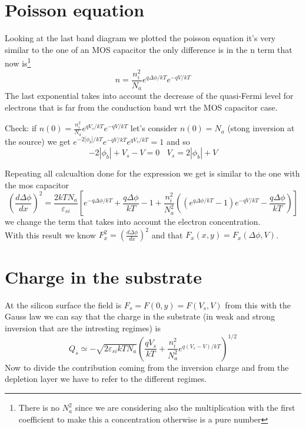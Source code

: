 \section{Poisson equation}
Looking at the last band diagram we plotted the poisson equation it's very similar to the one of an MOS capacitor the only difference is in the n term that now is\footnote{There is no $N_a^2$ since we are considering also the multiplication with the first coefficient to make this a concentration otherwise is a pure number} 
\begin{equation}
n=\frac{n_i^2}{N_a}e^{q\Delta \phi /kT}e^{-qV/kT}
\end{equation}
The last exponential takes into account the decrease of the quasi-Fermi level for electrons that is far from the conduction band wrt the MOS capacitor case.\\

\vspace{5mm}

Check: if $n(0)=\frac{n_i^2}{N_a}e^{qV_s/kT}e^{-qV/kT}$ let's consider $n(0)=N_a$ (stong inversion at the source) we get $e^{-2|\phi_b|/kT}e^{-qV/kT}e^{qV_s/kT}=1$ and so
\begin{equation}
-2|\phi_b|+V_s-V=0 \ \ \ \ V_s=2|\phi_b|+V
\end{equation}

\vspace{5mm}

Repeating all calcualtion done for the expression we get is similar to the one with the mos capacitor
\begin{equation}
\left(\frac{d\Delta\phi}{dx}\right)^2=\frac{2kTN_a}{\varepsilon_{si}}[e^{-q\Delta\phi/kT}+\frac{q\Delta\phi}{kT}-1+\frac{n_i^2}{N_a^2}\left((e^{q\Delta\phi/kT}-1)e^{-qV/kT}-\frac{q\Delta\phi}{kT}\right)]
\end{equation}
we change the term that takes into account the electron concentration.\\
With this result we know $F_x^2=\left(\frac{d\Delta\phi}{dx}\right)^2$ and that $F_x(x,y)=F_x(\Delta\phi,V)$.\\

\section{Charge in the substrate}
At the silicon surface the field is $F_s=F(0,y)=F(V_s,V)$ from this with the Gauss law we can say that the charge in the substrate (in weak and strong inversion that are the intresting regimes) is 
\begin{equation}
Q_s\simeq-\sqrt{2\varepsilon_{si}kTN_a}\left(\frac{qV_s}{kT}+\frac{n_i^2}{N_a^2}e^{q(V_s-V)/kT}\right)^{1/2}
\end{equation}
Now to divide the contribution coming from the inversion charge and from the depletion layer we have to refer to the different regimes.\\

